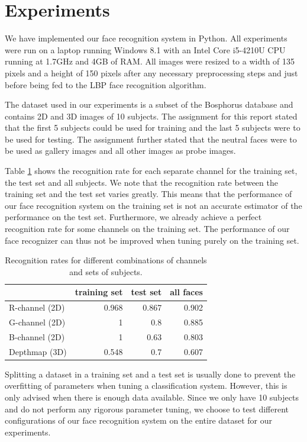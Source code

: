 \documentclass[]{article}
\begin{document}
\section{Experiments}
\graphicspath{{img/experiments/}}
We have implemented our face recognition system in Python. All experiments were run on a laptop running Windows 8.1 with an Intel Core i5-4210U CPU running at 1.7GHz and 4GB of RAM. All images were resized to a width of 135 pixels and a height of 150 pixels after any necessary preprocessing steps and just before being fed to the LBP face recognition algorithm.

The dataset used in our experiments is a subset of the Bosphorus database and contains 2D and 3D images of 10 subjects. The assignment for this report stated that the first 5 subjects could be used for training and the last 5 subjects were to be used for testing. The assignment further stated that the neutral faces were to be used as gallery images and all other images as probe images.

Table \ref{tab:traintestall} shows the recognition rate for each separate channel for the training set, the test set and all subjects. We note that the recognition rate between the training set and the test set varies greatly. This means that the performance of our face recognition system on the training set is not an accurate estimator of the performance on the test set. Furthermore, we already achieve a perfect recognition rate for some channels on the training set. The performance of our face recognizer can thus not be improved when tuning purely on the training set.

\begin{table}
	\centering
	\begin{tabular}{lrrr}
		\toprule
		& training set & test set & all faces\\
		\midrule
		R-channel (2D) & 0.968 & 0.867 & 0.902\\
		G-channel (2D) & 1 & 0.8 & 0.885 \\
		B-channel (2D) & 1 & 0.63 & 0.803 \\
		Depthmap (3D) & 0.548 & 0.7 & 0.607 \\
		\bottomrule
	\end{tabular}
	\caption{Recognition rates for different combinations of channels and sets of subjects.}
	\label{tab:traintestall}
\end{table}

Splitting a dataset in a training set and a test set is usually done to prevent the overfitting of parameters when tuning a classification system. However, this is only advised when there is enough data available. Since we only have 10 subjects and do not perform any rigorous parameter tuning, we choose to test different configurations of our face recognition system on the entire dataset for our experiments.
\end{document}
